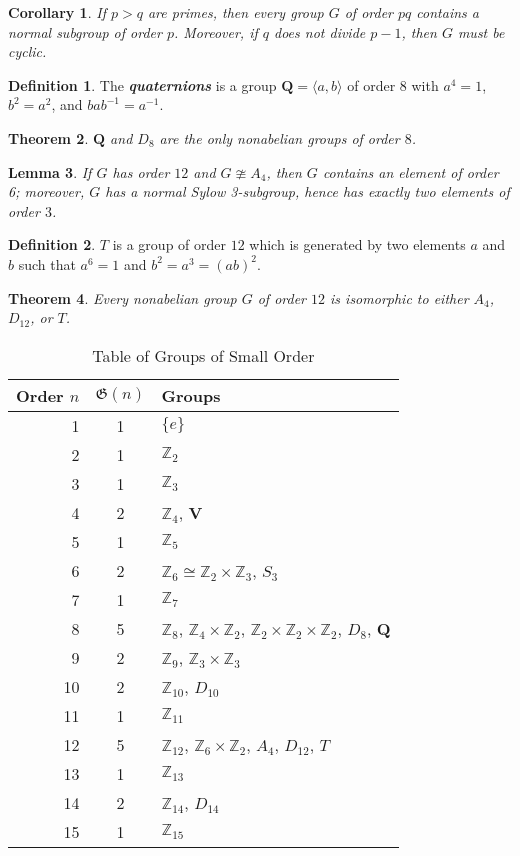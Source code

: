 \documentclass[12pt]{report}
\newtheorem{theorem}{Theorem}[chapter]
\newtheorem{corollary}[theorem]{Corollary}
\newtheorem{lemma}[theorem]{Lemma}
\theoremstyle{definition}
\newtheorem*{definition}{Definition}
\newcommand{\term}[1]{\textbf{\textit{#1}}}
\newcommand{\gen}[1]{{\langle}#1{\rangle}}
\begin{document}
\begin{corollary}
	If $p>q$ are primes, then every group $G$ of order $pq$ contains a normal subgroup of order $p$. Moreover, if $q$ does not divide $p-1$, then $G$ must be cyclic.
\end{corollary}

\begin{definition}
	The \term{quaternions} is a group $\mathbf{Q}=\gen{a,b}$ of order $8$ with $a^4=1$, $b^2=a^2$, and $bab^{-1}=a^{-1}$.
\end{definition}

\begin{theorem}
  $\mathbf{Q}$ and $D_8$ are the only nonabelian groups of order $8$.
\end{theorem}

\begin{lemma}
	If $G$ has order $12$ and $G\ncong A_4$, then $G$ contains an element of order 6; moreover, $G$ has a normal Sylow 3-subgroup, hence has exactly two elements of order $3$.
\end{lemma}

\begin{definition}
	$T$ is a group of order $12$ which is generated by two elements $a$ and $b$ such that $a^6=1$ and $b^2=a^3=(ab)^2$.
\end{definition}

\begin{theorem}
	Every nonabelian group $G$ of order $12$ is isomorphic to either $A_4$, $D_{12}$, or $T$.
\end{theorem}

\begin{table}[]
\centering
\caption*{Table of Groups of Small Order}
\label{my-label}
\begin{tabular}{r|c|l}
\hline
Order $n$ & $\mathfrak{G}(n)$ & Groups \\ \hline
 1 & 1 & $\{e\}$ \\
 2 & 1 & $\mathbb{Z}_2$ \\
 3 & 1 & $\mathbb{Z}_3$ \\
 4 & 2 & $\mathbb{Z}_4$, $\mathbf{V}$ \\
 5 & 1 & $\mathbb{Z}_5$ \\
 6 & 2 & $\mathbb{Z}_6 \cong \mathbb{Z}_2 \times \mathbb{Z}_3$, $S_3$ \\
 7 & 1 & $\mathbb{Z}_7$ \\
 8 & 5 & $\mathbb{Z}_8$, $\mathbb{Z}_4 \times \mathbb{Z}_2$, $\mathbb{Z}_2 \times \mathbb{Z}_2 \times \mathbb{Z}_2$, $D_8$, $\mathbf{Q}$ \\
 9 & 2 & $\mathbb{Z}_9$, $\mathbb{Z}_3 \times \mathbb{Z}_3$ \\
10 & 2 & $\mathbb{Z}_{10}$, $D_{10}$ \\
11 & 1 & $\mathbb{Z}_{11}$ \\
12 & 5 & $\mathbb{Z}_{12}$, $\mathbb{Z}_6 \times \mathbb{Z}_2$, $A_4$, $D_{12}$, $T$ \\
13 & 1 & $\mathbb{Z}_{13}$ \\
14 & 2 & $\mathbb{Z}_{14}$, $D_{14}$ \\
15 & 1 & $\mathbb{Z}_{15}$
\end{tabular}
\end{table}
\end{document}
